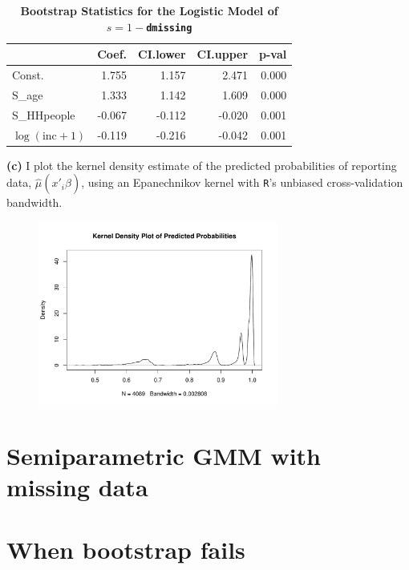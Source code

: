 \documentclass[12pt]{article}
\newcommand{\mtx}[1]{\ensuremath{\bm{\mathit{#1}}}}
\begin{document}
\begin{table}[!htpb]
\centering
\caption{\textbf{Bootstrap Statistics for the Logistic Model of $s=1-$\texttt{dmissing}}}
\begin{tabular}{lrrrr}
  \hline
 & Coef. & CI.lower & CI.upper & p-val \\ 
  \hline
Const. & 1.755 & 1.157 & 2.471 & 0.000 \\ 
  S\_age & 1.333 & 1.142 & 1.609 & 0.000 \\ 
  S\_HHpeople & -0.067 & -0.112 & -0.020 & 0.001 \\ 
  $\log(\text{inc}+1)$  & -0.119 & -0.216 & -0.042 & 0.001 \\ 
   \hline
\end{tabular}
\end{table}

\textbf{(c)} I plot the kernel density estimate of the predicted probabilities of reporting data, $\hat{\mu}(\mtx{x}'_i\hat{\mtx{\beta}})$, using an Epanechnikov kernel with \verb|R|'s unbiased cross-validation bandwidth.

\begin{figure}[!htpb]
    \centering
    
        \includegraphics[width=0.7\textwidth]{kdens.pdf}

\end{figure}

\newpage


\section{Semiparametric GMM with missing data}

\newpage

\section{When bootstrap fails}
\end{document}
